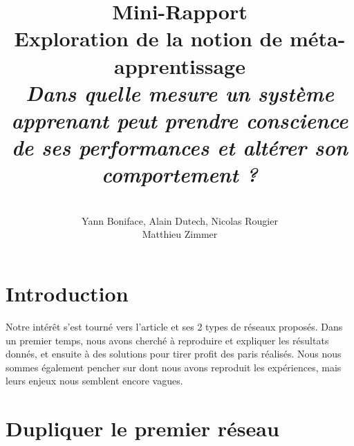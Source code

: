 \documentclass[a4paper,12pt]{article}
\title{
  \textbf{Mini-Rapport}
  \\[5cm]
  Exploration de la notion de méta-apprentissage
  \\[3cm]
  \textit{
  Dans quelle mesure un système apprenant peut prendre conscience de ses performances
  et altérer son comportement ?}
}
\author{
  \\[3cm]
  Yann Boniface, Alain Dutech, Nicolas Rougier \\
  Matthieu Zimmer}
\begin{document}
\maketitle








\newpage
\section{Introduction}

Notre intérêt s'est tourné vers l'article \cite{Cleeremans_2007} et ses 2 types de réseaux proposés.
Dans un premier temps, nous avons cherché à reproduire et expliquer les résultats
donnés, et ensuite à des solutions pour tirer profit des paris réalisés.
\newline
Nous nous sommes également pencher sur \cite{Pasquali_2010} dont nous avons reproduit
les expériences, mais leurs enjeux nous semblent encore vagues.


\section{Dupliquer le premier réseau}
\end{document}
